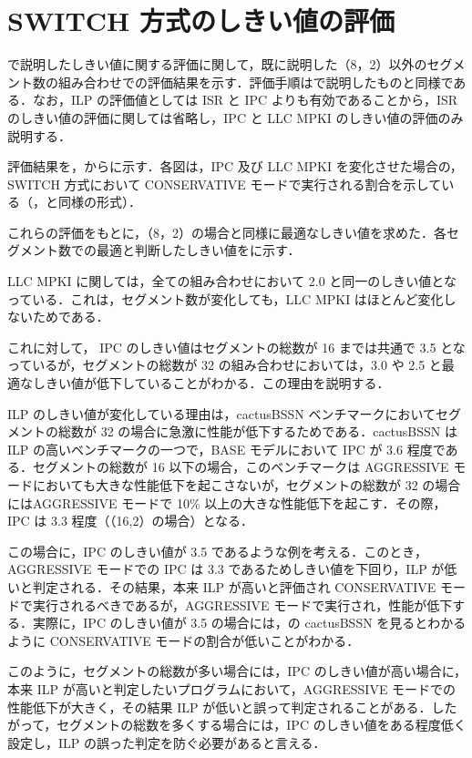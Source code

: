 
\chapter{SWITCH 方式のしきい値の評価}
\label{sec:appendix2}

で説明したしきい値に関する評価に関して，既に説明した（8，2）以外のセグメント数の組み合わせでの評価結果を示す．評価手順はで説明したものと同様である．なお，ILP の評価値としては ISR と IPC よりも有効であることから，ISR のしきい値の評価に関しては省略し，IPC と LLC MPKI のしきい値の評価のみ説明する．

評価結果を，からに示す．各図は，IPC 及び  LLC MPKI を変化させた場合の，SWITCH 方式において CONSERVATIVE モードで実行される割合を示している（，と同様の形式）．

これらの評価をもとに，（8，2）の場合と同様に最適なしきい値を求めた．各セグメント数での最適と判断したしきい値をに示す．

LLC MPKI に関しては，全ての組み合わせにおいて 2.0 と同一のしきい値となっている．これは，セグメント数が変化しても，LLC MPKI はほとんど変化しないためである．

これに対して， IPC のしきい値はセグメントの総数が 16 までは共通で 3.5 となっているが，セグメントの総数が 32 の組み合わせにおいては，3.0 や 2.5 と最適なしきい値が低下していることがわかる．この理由を説明する．

ILP のしきい値が変化している理由は，cactusBSSN ベンチマークにおいてセグメントの総数が 32 の場合に急激に性能が低下するためである．cactusBSSN は ILP の高いベンチマークの一つで，BASE モデルにおいて IPC が 3.6 程度である．セグメントの総数が 16 以下の場合，このベンチマークは AGGRESSIVE モードにおいても大きな性能低下を起こさないが，セグメントの総数が 32 の場合にはAGGRESSIVE モードで 10\% 以上の大きな性能低下を起こす．その際，IPC は 3.3 程度（（16,2）の場合）となる．

この場合に，IPC のしきい値が 3.5 であるような例を考える．このとき，AGGRESSIVE モードでの IPC は 3.3 であるためしきい値を下回り，ILP が低いと判定される．その結果，本来 ILP が高いと評価され CONSERVATIVE モードで実行されるべきであるが，AGGRESSIVE モードで実行され，性能が低下する．実際に，IPC のしきい値が 3.5 の場合には，の cactusBSSN を見るとわかるように CONSERVATIVE モードの割合が低いことがわかる．

このように，セグメントの総数が多い場合には，IPC のしきい値が高い場合に，本来 ILP が高いと判定したいプログラムにおいて，AGGRESSIVE モードでの性能低下が大きく，その結果 ILP が低いと誤って判定されることがある．したがって，セグメントの総数を多くする場合には，IPC のしきい値をある程度低く設定し，ILP の誤った判定を防ぐ必要があると言える．

